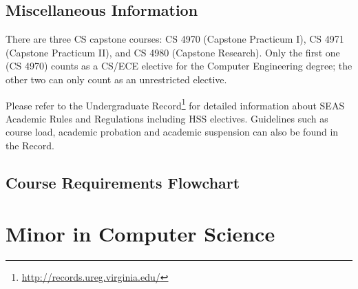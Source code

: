 \documentclass[10pt,letter]{book}
\newenvironment{itemlist}{
\begin{itemize}
\setlength{\itemsep}{0pt}
\setlength{\parskip}{0pt}}
{\end{itemize}}
\newcommand{\mychapter}[2]{\chapter{#1}\renewcommand{\leftmark}{\textsc{#2}}}
\newcommand{\mysection}[1]{\section{#1}\renewcommand{\rightmark}{#1}}
\newcommand{\myurl}[1]{\footnote{\scriptsize\url{#1}}}
\begin{document}

\mysection{Miscellaneous Information}

There are three CS capstone courses: CS 4970 (Capstone Practicum I), 
CS 4971 (Capstone Practicum II), and CS 4980 (Capstone Research).
Only the first one (CS 4970) counts as a CS/ECE elective for the
Computer Engineering degree; the other two can only count as an
unrestricted elective.

Please refer to the Undergraduate
Record\myurl{http://records.ureg.virginia.edu/} for detailed
information about SEAS Academic Rules and Regulations including HSS
electives. Guidelines such as course load, academic probation and
academic suspension can also be found in the Record.




\clearpage
\mysection{Course Requirements Flowchart}

\begin{figure}[h!]
\end{figure}



\clearpage
\mychapter{Minor in Computer Science}{CS Minor}
\label{sec:csminor}

\end{document}
